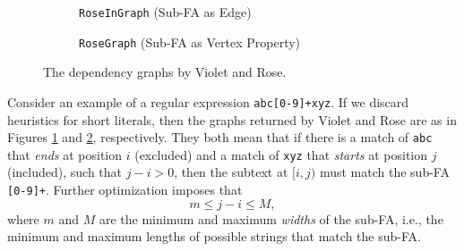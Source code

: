 \begin{figure}[htbp]
  \centering
  \begin{subfigure}[b]{0.48\textwidth}

    \centering
    \caption{\texttt{RoseInGraph} (Sub-FA as Edge)}
    \label{fig:rose_in_graph}
  \end{subfigure}
  \hfill
  \begin{subfigure}[b]{0.48\textwidth}
    \centering
    \caption{\texttt{RoseGraph} (Sub-FA as Vertex Property)}
    \label{fig:rose_graph}
  \end{subfigure}
  \caption{The dependency graphs by Violet and Rose.}
  \label{fig:graph_comparison}
\end{figure}

Consider an example of a regular expression \texttt{abc[0-9]+xyz}. If we discard heuristics for short literals, then the graphs returned by Violet and Rose are as in Figures \ref{fig:rose_in_graph} and \ref{fig:rose_graph}, respectively. They both mean that if there is a match of \texttt{abc} that \textit{ends} at position $i$ (excluded) and a match of \texttt{xyz} that \textit{starts} at position $j$ (included), such that $j-i>0$, then the subtext at $[i, j)$ must match the sub-FA \texttt{[0-9]+}. Further optimization imposes that
$$m \le j-i \le M,$$
where $m$ and $M$ are the minimum and maximum \textit{widths} of the sub-FA, i.e., the minimum and maximum lengths of possible strings that match the sub-FA.

